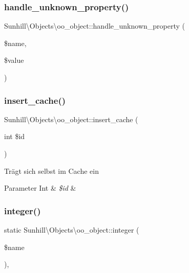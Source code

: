 \subsubsection{\texorpdfstring{handle\+\_\+unknown\+\_\+property()}{handle\_unknown\_property()}}
{\footnotesize\ttfamily Sunhill\textbackslash{}\+Objects\textbackslash{}oo\+\_\+object\+::handle\+\_\+unknown\+\_\+property (\begin{DoxyParamCaption}\item[{}]{\$name,  }\item[{}]{\$value }\end{DoxyParamCaption})\hspace{0.3cm}{\ttfamily [protected]}}

\mbox{\label{classSunhill_1_1Objects_1_1oo__object_affd8a6f5e8d86c9f0c1497feb81ef04e}} 
\subsubsection{\texorpdfstring{insert\+\_\+cache()}{insert\_cache()}}
{\footnotesize\ttfamily Sunhill\textbackslash{}\+Objects\textbackslash{}oo\+\_\+object\+::insert\+\_\+cache (\begin{DoxyParamCaption}\item[{int}]{\$id }\end{DoxyParamCaption})\hspace{0.3cm}{\ttfamily [protected]}}

Trägt sich selbst im Cache ein 
\begin{DoxyParams}[1]{Parameter}
Int & {\em \$id} & \\
\hline
\end{DoxyParams}
\mbox{\label{classSunhill_1_1Objects_1_1oo__object_a592ff3a9229becf7aadaf028e0d4a799}} 
\subsubsection{\texorpdfstring{integer()}{integer()}}
{\footnotesize\ttfamily static Sunhill\textbackslash{}\+Objects\textbackslash{}oo\+\_\+object\+::integer (\begin{DoxyParamCaption}\item[{}]{\$name }\end{DoxyParamCaption})\hspace{0.3cm}{\ttfamily [static]}, {\ttfamily [protected]}}

